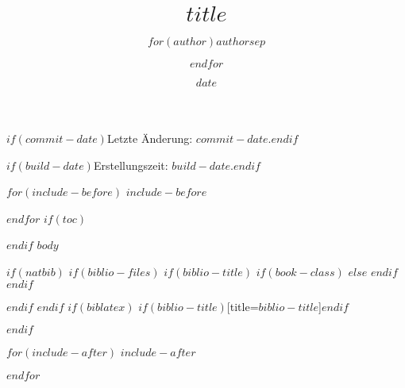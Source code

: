 \documentclass[
    a5paper,pagesize,
    10pt,
    DIV=12, %
    BCOR=2mm,
    open=any, %
    ngerman
]{scrbook}
\title{$title$}
\author{$for(author)$$author$$sep$ \and $endfor$}
\date{$date$}
\begin{document}
\maketitle

$if(commit-date)$Letzte Änderung: $commit-date$.$endif$

$if(build-date)$Erstellungszeit: $build-date$.$endif$

$for(include-before)$
$include-before$

$endfor$
$if(toc)$
{
\hypersetup{linkcolor=black}
\setcounter{tocdepth}{$toc-depth$}
\renewcommand{\contentsname}{Inhaltsverzeichnis}
\renewcommand{\listfigurename}{Abbildungsverzeichnis}
\tableofcontents
\listoffigures
}
$endif$
$body$

$if(natbib)$
$if(biblio-files)$
$if(biblio-title)$
$if(book-class)$
\renewcommand\bibname{$biblio-title$}
$else$
\renewcommand\refname{$biblio-title$}
$endif$
$endif$


$endif$
$endif$
$if(biblatex)$
\printbibliography$if(biblio-title)$[title=$biblio-title$]$endif$

$endif$

$for(include-after)$
$include-after$

$endfor$
\end{document}
